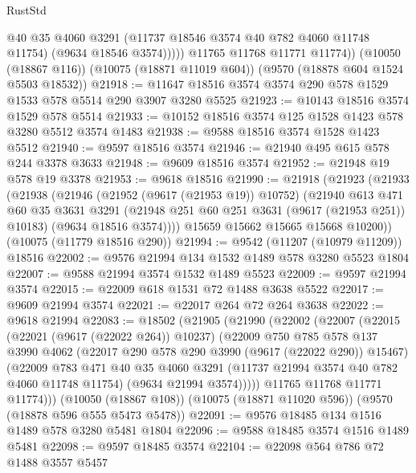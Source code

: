 \begin{lexlean}{RustStd}
\begin{coremodule}
                @40
                @35
                @4060
                @3291
                (@11737 @18546 @3574 @40 @782 @4060 @11748 @11754)
                (@9634 @18546 @3574)))))
        @11765
        @11768
        @11771
        @11774))
    (@10050 (@18867 @116))
    (@10075 (@18871 @11019 @604))
    (@9570 (@18878 @604 @1524 @5503 @18532))
@21918 := @11647 @18516 @3574 @3574 @290 @578 @1529 @1533 @578 @5514 @290 @3907 @3280 @5525
@21923 := @10143 @18516 @3574 @1529 @578 @5514
@21933 := @10152 @18516 @3574 @125 @1528 @1423 @578 @3280 @5512 @3574 @1483
@21938 := @9588 @18516 @3574 @1528 @1423 @5512
@21940 := @9597 @18516 @3574
@21946 := @21940 @495 @615 @578 @244 @3378 @3633
@21948 := @9609 @18516 @3574
@21952 := @21948 @19 @578 @19 @3378
@21953 := @9618 @18516
@21990 := @21918
    (@21923
      (@21933
        (@21938
          (@21946
            (@21952 (@9617 (@21953 @19)) @10752)
            (@21940
              @613
              @471
              @60
              @35
              @3631
              @3291
              (@21948 @251 @60 @251 @3631 (@9617 (@21953 @251)) @10183)
              (@9634 @18516 @3574))))
        @15659
        @15662
        @15665
        @15668
        @10200))
    (@10075 (@11779 @18516 @290))
@21994 := @9542 (@11207 (@10979 @11209)) @18516
@22002 := @9576 @21994 @134 @1532 @1489 @578 @3280 @5523 @1804
@22007 := @9588 @21994 @3574 @1532 @1489 @5523
@22009 := @9597 @21994 @3574
@22015 := @22009 @618 @1531 @72 @1488 @3638 @5522
@22017 := @9609 @21994 @3574
@22021 := @22017 @264 @72 @264 @3638
@22022 := @9618 @21994
@22083 := @18502
    (@21905
      (@21990
        (@22002
          (@22007
            (@22015
              (@22021 (@9617 (@22022 @264)) @10237)
              (@22009
                @750
                @785
                @578
                @137
                @3990
                @4062
                (@22017 @290 @578 @290 @3990 (@9617 (@22022 @290)) @15467)
                (@22009
                  @783
                  @471
                  @40
                  @35
                  @4060
                  @3291
                  (@11737 @21994 @3574 @40 @782 @4060 @11748 @11754)
                  (@9634 @21994 @3574)))))
          @11765
          @11768
          @11771
          @11774)))
    (@10050 (@18867 @108))
    (@10075 (@18871 @11020 @596))
    (@9570 (@18878 @596 @555 @5473 @5478))
@22091 := @9576 @18485 @134 @1516 @1489 @578 @3280 @5481 @1804
@22096 := @9588 @18485 @3574 @1516 @1489 @5481
@22098 := @9597 @18485 @3574
@22104 := @22098 @564 @786 @72 @1488 @3557 @5457

\end{coremodule}
\end{lexlean}
